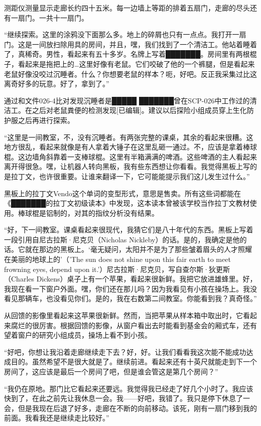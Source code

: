 测距仪测量显示走廊长约四十五米。每一边墙上等距的排着五扇门，走廊的尽头还有一扇门。一共十一扇门。

“继续探索。这里的涂鸦没下面那么多。地上的碎屑也只有一点点。我打开一扇门。这是一间放扫除用具的房间，并且，嘿，我们找到了一个清洁工。他站着睡着了，真稀奇。男性，看起来有五十多岁。名牌上写着███████。房间里有两根棍子，看起来是拖把上的…这里好像有老鼠。它们咬破了他的一个裤腿，但是看起来老鼠好像没咬过沉睡者。什么？你想要老鼠的样本？呃，好吧。反正我采集过比这离奇好多的玩意。好了，拿到了。”

通过和文件026-4比对发现沉睡者是█████ ███████曾在SCP-026中工作过的清洁工。在之后对老鼠粪便的检测发现{[}已编辑]。建议以后探险小组成员穿上生化防护服之后再进行探索。

“这里是一间教室，不，没有沉睡者。有两张完整的课桌，其余的看起来很糟。这地方很乱，看起来就像是有人拿着大锤子在这里乱砸一通过。不，应该是拿着棒球棍。这边墙角斜靠着一支棒球棍。这里有半箱满满的啤酒。这些啤酒的主人看起来离开得很急。嘿，让机器人转向黑板，我有些东西想让你看看。我觉得黑板上写的是拉丁文，也许很重要。让谁来翻译一下，它可能能提示我们这儿发生过什么。”

黑板上的拉丁文Vendo这个单词的变型形式，意思是售卖。所有这些词都能在《███████的拉丁文初级读本》中发现，这本读本曾被该学校当作拉丁文教材使用。棒球棍是铝制的，对其的指纹分析没有结果。

“好，下一间教室。课桌看起来很现代，我猜它们是八十年代的东西。黑板上写着一段引用自尼古拉斯·尼克贝（Nicholas Nickleby）的话。是的，我确定是他的话。它就在那边的黑板上。‘毫无疑问，太阳并不是为了那些皱着眉头的人才照耀在美丽的地球上的’（'The sun does not shine upon this fair earth to meet frowning eyes, depend upon it.'）尼古拉斯·尼克贝，写自查尔斯·狄更斯（Charles Dickens）桌子上有一个苹果，看起来很新鲜。我把它放进雄蜂里。好，我现在看一下窗户外面。嘿，你们还在那儿吗？因为我看见有小孩在操场上。我没看见那辆车，也没看见你们。是的，我在右数第二间教室。你能看到我？真奇怪。”

从回馈的影像里看起来这苹果很新鲜。然而，当把苹果从样本箱中取出时，它看起来腐烂的很厉害。根据回馈的影像，从窗户看出去时能看到基金会的厢式车，还有望着窗户的研究小组成员，操场上看不到小孩。

“好吧，你想让我沿着走廊继续走下去？好，好。让我们看看我这次能不能成功达成目的。虽然希望不是很大就是了。继续前进。看起来还有十英尺就能走到下一个房间了，这应该是最后一个房间了吧，但是谁会管这是第几个房间？”

“我仍在原地。那门比它看起来还要远。我觉得我已经走了好几个小时了。我应该快到了，在此之前先让我休息一会。我——好吧，我错了。我只是停下休息了一会，但是我现在后退了好多，走廊在不断的向前移动。该死，刚有一扇门移到我的前面。我看我还是继续走比较好。”

